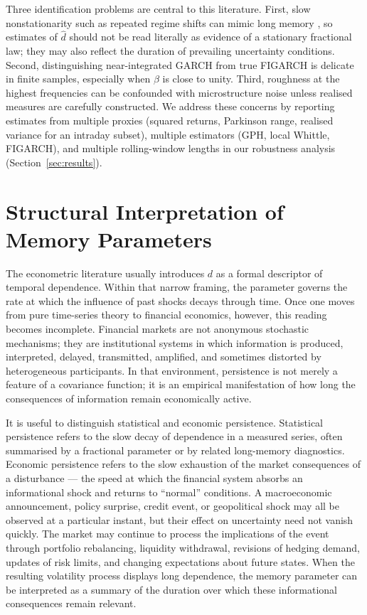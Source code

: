 \documentclass[11pt,a4paper]{article}
\newcommand{\dhat}{\hat d}
\begin{document}
Three identification problems are central to this literature. First, slow
nonstationarity such as repeated regime shifts can mimic long memory
\citep{mikosch2004nonstationarities}, so estimates of $\dhat$ should not
be read literally as evidence of a stationary fractional law; they may
also reflect the duration of prevailing uncertainty conditions. Second,
distinguishing near-integrated GARCH from true FIGARCH is delicate in
finite samples, especially when $\beta$ is close to unity. Third,
roughness at the highest frequencies can be confounded with microstructure
noise unless realised measures are carefully constructed. We address these
concerns by reporting estimates from multiple proxies (squared returns,
Parkinson range, realised variance for an intraday subset), multiple
estimators (GPH, local Whittle, FIGARCH), and multiple rolling-window
lengths in our robustness analysis (Section~\ref{sec:results}).

\section{Structural Interpretation of Memory Parameters}
\label{sec:structural}

The econometric literature usually introduces $d$ as a formal descriptor
of temporal dependence. Within that narrow framing, the parameter governs
the rate at which the influence of past shocks decays through time. Once
one moves from pure time-series theory to financial economics, however,
this reading becomes incomplete. Financial markets are not anonymous
stochastic mechanisms; they are institutional systems in which information
is produced, interpreted, delayed, transmitted, amplified, and sometimes
distorted by heterogeneous participants. In that environment, persistence
is not merely a feature of a covariance function; it is an empirical
manifestation of how long the consequences of information remain
economically active.

It is useful to distinguish statistical and economic persistence.
Statistical persistence refers to the slow decay of dependence in a
measured series, often summarised by a fractional parameter or by related
long-memory diagnostics. Economic persistence refers to the slow
exhaustion of the market consequences of a disturbance --- the speed at
which the financial system absorbs an informational shock and returns to
``normal'' conditions. A macroeconomic announcement, policy surprise,
credit event, or geopolitical shock may all be observed at a particular
instant, but their effect on uncertainty need not vanish quickly. The
market may continue to process the implications of the event through
portfolio rebalancing, liquidity withdrawal, revisions of hedging demand,
updates of risk limits, and changing expectations about future states.
When the resulting volatility process displays long dependence, the
memory parameter can be interpreted as a summary of the duration over
which these informational consequences remain relevant.
\end{document}
